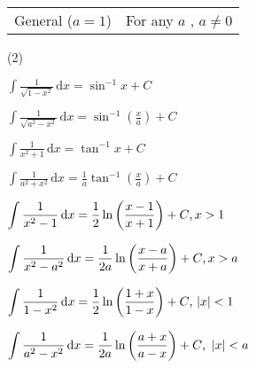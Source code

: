 \documentclass[11pt,a4paper]{book}
\begin{document}
\begin{tcolorbox}[colback=blue!5, colframe=black, boxrule=.4pt, sharpish corners]

\begin{tabular}{>{\centering}p{4.5cm}>{\centering}p{10cm}}
General ($a=1$) & For any $a$ , $a\neq0$\tabularnewline
\end{tabular}

\begin{tasks}[style=itemize,label-width=3.5ex,column-sep=-.3cm](2)

\task ${\displaystyle \int\frac{1}{\sqrt{1-x^{2}}}\, \mathrm{d}x=\sin^{-1}x}+C$

\task ${\displaystyle \int\frac{1}{\sqrt{a^{2}-x^{2}}}\, \mathrm{d}x=\sin^{-1}\left(\frac{x}{a}\right)}+C$

\task ${\displaystyle \int\frac{1}{x^{2}+1}\, \mathrm{d}x=\tan^{-1}x}+C$

\task ${\displaystyle \int\frac{1}{a^{2}+x^{2}}\, \mathrm{d}x=\frac{1}{a}\tan^{-1}\left(\frac{x}{a}\right)}+C$

\task ${\displaystyle \int\frac{1}{x^{2}-1}\, \mathrm{d}x=\frac{1}{2}\ln\left(\frac{x-1}{x+1}\right)}+C\text{,\,\ensuremath{x>1}}$

\task ${\displaystyle \int\frac{1}{x^{2}-a^{2}}\, \mathrm{d}x=\frac{1}{2a}\ln\left(\frac{x-a}{x+a}\right)}+C\text{,\,\ensuremath{x>a}}$

\task ${\displaystyle \int\frac{1}{1-x^{2}}\, \mathrm{d}x=\frac{1}{2}\ln\left(\frac{1+x}{1-x}\right)}+C\text{, \ensuremath{\left|x\right|<1}}$

\task ${\displaystyle \int\frac{1}{a^{2}-x^{2}}\, \mathrm{d}x=\frac{1}{2a}\ln\left(\frac{a+x}{a-x}\right)}+C\text{, \,\ensuremath{\left|x\right|<a}}$

\end{tasks}
\end{tcolorbox}
\end{document}
